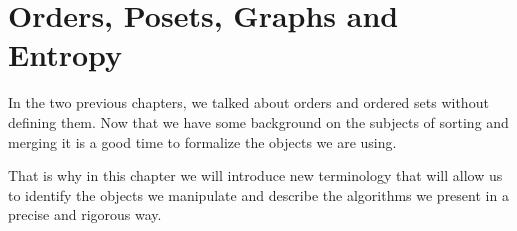 \chapter{Orders, Posets, Graphs and Entropy}

In the two previous chapters, we talked about orders and ordered sets without
defining them. Now that we have some background on the subjects of
sorting and merging it is a good time to formalize the objects we are using.

That is why in this chapter we will introduce new terminology that will allow
us to identify the objects we manipulate and describe the algorithms we present
in a precise and rigorous way.

